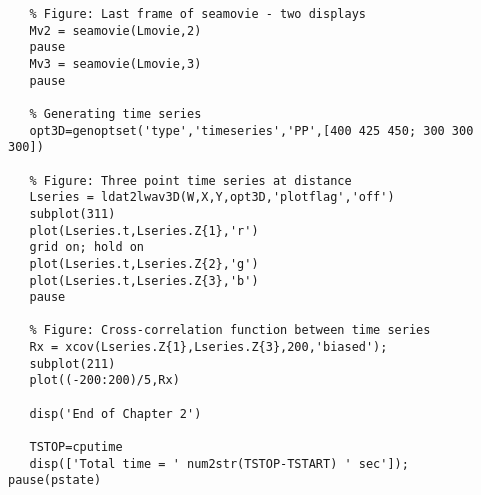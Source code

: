 {\begin{verbatim}
   % Figure: Last frame of seamovie - two displays
   Mv2 = seamovie(Lmovie,2)
   pause
   Mv3 = seamovie(Lmovie,3)
   pause
	
   % Generating time series
   opt3D=genoptset('type','timeseries','PP',[400 425 450; 300 300 300])

   % Figure: Three point time series at distance
   Lseries = ldat2lwav3D(W,X,Y,opt3D,'plotflag','off')
   subplot(311)
   plot(Lseries.t,Lseries.Z{1},'r')
   grid on; hold on
   plot(Lseries.t,Lseries.Z{2},'g')
   plot(Lseries.t,Lseries.Z{3},'b')
   pause
   
   % Figure: Cross-correlation function between time series
   Rx = xcov(Lseries.Z{1},Lseries.Z{3},200,'biased');
   subplot(211)
   plot((-200:200)/5,Rx)
   
   disp('End of Chapter 2')

   TSTOP=cputime
   disp(['Total time = ' num2str(TSTOP-TSTART) ' sec']);
pause(pstate)
\end{verbatim}
}


